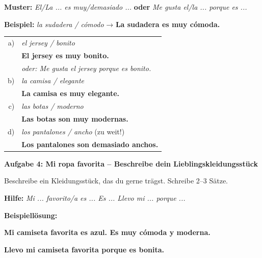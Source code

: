 \documentclass[11pt, a4paper]{article}
\newcommand{\punktebox}[1]{\hfill\fbox{\scriptsize \_\kern-1pt/#1}}
\newcommand{\es}[1]{\textcolor{spanisch}{\textbf{#1}}}
\newcommand{\lsg}[1]{\textcolor{loesung}{\textbf{#1}}}
\begin{document}
\vspace{3pt}
\textbf{Muster:} \textit{El/La ... es muy/demasiado ...} \textbf{oder} \textit{Me gusta el/la ... porque es ...}

\vspace{4pt}
\textbf{Beispiel:} \textit{la sudadera / cómodo} → \es{La sudadera es muy cómoda.}

\vspace{6pt}

\begin{tabular}{@{}rl@{}}
a) & \textit{el jersey / bonito} \\[0.3em]
   & \lsg{El jersey es muy bonito.} \\
   & \textit{\small oder: Me gusta el jersey porque es bonito.} \\[0.6em]
b) & \textit{la camisa / elegante} \\[0.3em]
   & \lsg{La camisa es muy elegante.} \\[0.6em]
c) & \textit{las botas / moderno} \\[0.3em]
   & \lsg{Las botas son muy modernas.} \\[0.6em]
d) & \textit{los pantalones / ancho} (zu weit!) \\[0.3em]
   & \lsg{Los pantalones son demasiado anchos.} \\
\end{tabular}

\vspace{8pt}


\textbf{\textcolor{spanisch}{Aufgabe 4: Mi ropa favorita -- Beschreibe dein Lieblingskleidungsstück}} \punktebox{3}

\vspace{3pt}
\small
Beschreibe ein Kleidungsstück, das du gerne trägst. Schreibe 2--3 Sätze.

\vspace{3pt}
\textbf{Hilfe:} \textit{Mi ... favorito/a es ... Es ... Llevo mi ... porque ...}

\vspace{6pt}
\lsg{Beispiellösung:}

\lsg{Mi camiseta favorita es azul. Es muy cómoda y moderna.}

\lsg{Llevo mi camiseta favorita porque es bonita.}

\end{document}
